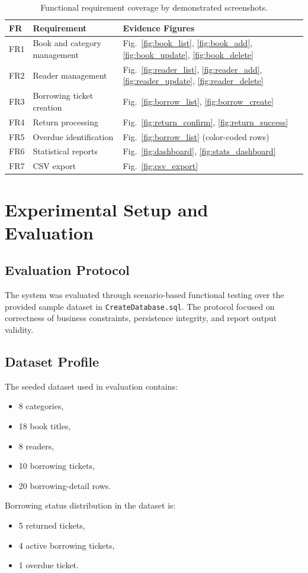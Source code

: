 \documentclass[12pt,a4paper]{article}
\begin{document}
\begin{table}[H]
\centering
\caption{Functional requirement coverage by demonstrated screenshots.}
\label{tab:fr_coverage}
\begin{tabularx}{\textwidth}{p{1.5cm}p{5.5cm}X}
\toprule
\textbf{FR} & \textbf{Requirement} & \textbf{Evidence Figures} \\
\midrule
FR1 & Book and category management & Fig.~\ref{fig:book_list}, \ref{fig:book_add}, \ref{fig:book_update}, \ref{fig:book_delete} \\
FR2 & Reader management & Fig.~\ref{fig:reader_list}, \ref{fig:reader_add}, \ref{fig:reader_update}, \ref{fig:reader_delete} \\
FR3 & Borrowing ticket creation & Fig.~\ref{fig:borrow_list}, \ref{fig:borrow_create} \\
FR4 & Return processing & Fig.~\ref{fig:return_confirm}, \ref{fig:return_success} \\
FR5 & Overdue identification & Fig.~\ref{fig:borrow_list} (color-coded rows) \\
FR6 & Statistical reports & Fig.~\ref{fig:dashboard}, \ref{fig:stats_dashboard} \\
FR7 & CSV export & Fig.~\ref{fig:csv_export} \\
\bottomrule
\end{tabularx}
\end{table}

\section{Experimental Setup and Evaluation}
\subsection{Evaluation Protocol}
The system was evaluated through scenario-based functional testing over the provided sample dataset in \texttt{CreateDatabase.sql}. The protocol focused on correctness of business constraints, persistence integrity, and report output validity.

\subsection{Dataset Profile}
The seeded dataset used in evaluation contains:
\begin{itemize}[leftmargin=1.5cm]
    \item 8 categories,
    \item 18 book titles,
    \item 8 readers,
    \item 10 borrowing tickets,
    \item 20 borrowing-detail rows.
\end{itemize}
Borrowing status distribution in the dataset is:
\begin{itemize}[leftmargin=1.5cm]
    \item 5 returned tickets,
    \item 4 active borrowing tickets,
    \item 1 overdue ticket.
\end{itemize}
\end{document}

